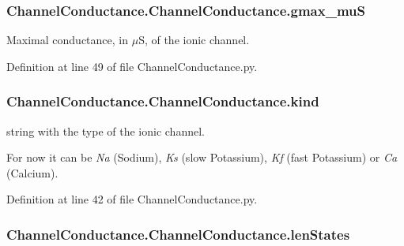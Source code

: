 \subsubsection[{\texorpdfstring{gmax\+\_\+muS}{gmax_muS}}]{\setlength{\rightskip}{0pt plus 5cm}Channel\+Conductance.\+Channel\+Conductance.\+gmax\+\_\+muS}\hypertarget{class_channel_conductance_1_1_channel_conductance_a80a0238a90b30b411c9381f682d0aeec}{}\label{class_channel_conductance_1_1_channel_conductance_a80a0238a90b30b411c9381f682d0aeec}


Maximal conductance, in $\mu$S, of the ionic channel. 



Definition at line 49 of file Channel\+Conductance.\+py.

\subsubsection[{\texorpdfstring{kind}{kind}}]{\setlength{\rightskip}{0pt plus 5cm}Channel\+Conductance.\+Channel\+Conductance.\+kind}\hypertarget{class_channel_conductance_1_1_channel_conductance_a7bf3e28aab2160014358cde589f2ec39}{}\label{class_channel_conductance_1_1_channel_conductance_a7bf3e28aab2160014358cde589f2ec39}


string with the type of the ionic channel. 

For now it can be {\itshape Na} (Sodium), {\itshape Ks} (slow Potassium), {\itshape Kf} (fast Potassium) or {\itshape Ca} (Calcium). 

Definition at line 42 of file Channel\+Conductance.\+py.

\subsubsection[{\texorpdfstring{len\+States}{lenStates}}]{\setlength{\rightskip}{0pt plus 5cm}Channel\+Conductance.\+Channel\+Conductance.\+len\+States}\hypertarget{class_channel_conductance_1_1_channel_conductance_ae217799d13e5d225af048b7ba503fde1}{}\label{class_channel_conductance_1_1_channel_conductance_ae217799d13e5d225af048b7ba503fde1}


